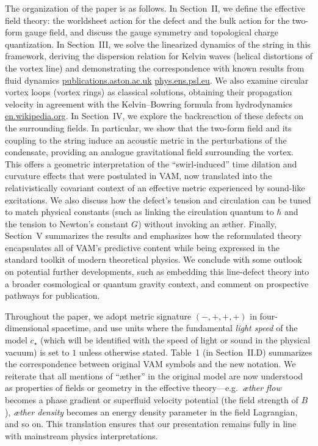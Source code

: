 \documentclass[12pt]{article}
\begin{document}
The organization of the paper is as follows. In Section~II, we define the effective field theory: the worldsheet action for the defect and the bulk action for the two-form gauge field, and discuss the gauge symmetry and topological charge quantization. In Section~III, we solve the linearized dynamics of the string in this framework, deriving the dispersion relation for Kelvin waves (helical distortions of the vortex line) and demonstrating the correspondence with known results from fluid dynamics%
\href{https://publications.aston.ac.uk/id/eprint/28756/1/Kelvin_wave_cascade_in_the_vortex_filament_model.pdf#:~:text=relation%20%CF%89,4%CF%80}{publications.aston.ac.uk}%
\href{https://www.phys.ens.psl.eu/~brachet/files/Publications_&_Reprints_files/5097b266-f35c-4097-8f95-260f190973ce.pdf#:~:text=particular%2C%20note%20that%20in%20the,18%29%20%CE%94vL%20ui}{phys.ens.psl.eu}.
We also examine circular vortex loops (vortex rings) as classical solutions, obtaining their propagation velocity in agreement with the Kelvin--Bowring formula from hydrodynamics%
\href{https://en.wikipedia.org/wiki/Vortex_ring#:~:text=,frac%20%7B1%7D%7B4%7D%7D%5Cright}{en.wikipedia.org}.
In Section~IV, we explore the backreaction of these defects on the surrounding fields. In particular, we show that the two-form field and its coupling to the string induce an acoustic metric in the perturbations of the condensate, providing an analogue gravitational field surrounding the vortex. This offers a geometric interpretation of the ``swirl-induced'' time dilation and curvature effects that were postulated in VAM, now translated into the relativistically covariant context of an effective metric experienced by sound-like excitations. We also discuss how the defect's tension and circulation can be tuned to match physical constants (such as linking the circulation quantum to $\hbar$ and the tension to Newton's constant $G$) without invoking an æther. Finally, Section~V summarizes the results and emphasizes how the reformulated theory encapsulates all of VAM's predictive content while being expressed in the standard toolkit of modern theoretical physics. We conclude with some outlook on potential further developments, such as embedding this line-defect theory into a broader cosmological or quantum gravity context, and comment on prospective pathways for publication.

Throughout the paper, we adopt metric signature $(-,+,+,+)$ in four-dimensional spacetime, and use units where the fundamental \emph{light speed} of the model $c_\star$ (which will be identified with the speed of light or sound in the physical vacuum) is set to $1$ unless otherwise stated. Table~1 (in Section~II.D) summarizes the correspondence between original VAM symbols and the new notation. We reiterate that all mentions of ``æther'' in the original model are now understood as properties of fields or geometry in the effective theory---e.g.\ \emph{æther flow} becomes a phase gradient or superfluid velocity potential (the field strength of $B$), \emph{æther density} becomes an energy density parameter in the field Lagrangian, and so on. This translation ensures that our presentation remains fully in line with mainstream physics interpretations.
\end{document}
